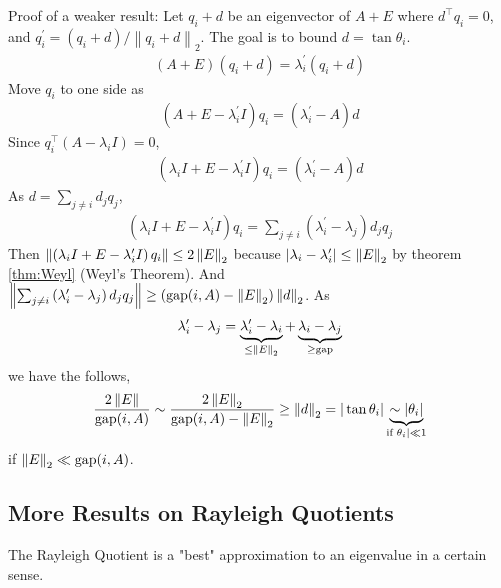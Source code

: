 \documentclass[11pt]{article}
\numberwithin{equation}{section}
\begin{document}
Proof of a weaker result:
Let $q_{i}+d$ be an eigenvector of $A+E$ where $d^\top q_i = 0$, and $q_i^\prime = \left(q_{i}+d\right) /\left\|q_{i}+d\right\|_{2}$. The goal is to bound $d = \tan \theta_i$. \begin{align*}
    (A+E)\left(q_{i}+d\right)=\lambda_i^\prime \left(q_{i}+d\right)
\end{align*}
Move $q_i$ to one side as \begin{align*}
    \left( A+E-\lambda_i^\prime I \right)q_{i} = \left( \lambda_i^\prime - A \right)d
\end{align*}
Since $q_{i}^{\top}\left(A-\lambda_{i} I\right)=0$, \begin{align*}
    \left( \lambda_{i}I +E-\lambda_i^\prime I \right)q_{i} = \left( \lambda_i^\prime - A \right)d
\end{align*}
As $d = \sum_{j \neq i}d_j q_j$, \begin{align*}
    \left( \lambda_{i}I +E-\lambda_i^\prime I \right)q_{i} = \sum_{j \neq i} \left( \lambda_i^\prime - \lambda_j \right) d_j q_j
\end{align*}
Then $\left\| \left( \lambda_{i}I +E-\lambda_i^\prime I \right)q_{i} \right\| \leq 2 \left\| E \right\|_2$ because $|\lambda_{i}-\lambda_i^\prime | \leq \left\| E \right\|_2$ by theorem \ref{thm:Weyl} (Weyl's Theorem).
And $\left\| \sum_{j \neq i} \left( \lambda_i^\prime - \lambda_j \right) d_j q_j \right\| \geq \left( \operatorname{gap}(i, A)  - \left\| E \right\|_2 \right) \left\| d \right\|_2 $.
As \begin{align*}
    \lambda_i^\prime - \lambda_j = \underbrace{\lambda_i^\prime - \lambda_i}_{\leq \left\| E \right\|_2} + \underbrace{\lambda_i - \lambda_j}_{\geq \operatorname{gap}}
\end{align*}
we have the follows, \begin{align*}
    \frac{2\left\| E \right\|}{\operatorname{gap}(i, A)} \sim \frac{2\left\| E \right\|_2}{\operatorname{gap}(i, A)-\left\| E \right\|_2} \geq \left\| d \right\|_2 = |\tan \theta_i| \underbrace{\sim |\theta_i|}_{\text{if }\theta_i| \ll 1}
\end{align*}
if $\left\| E \right\|_2 \ll \operatorname{gap}(i, A)$.

\subsection{More Results on Rayleigh Quotients}
The Rayleigh Quotient is a "best" approximation to an eigenvalue in a certain sense.
\end{document}
